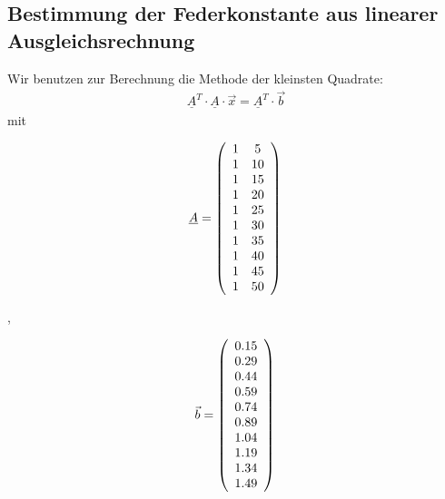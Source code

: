 \subsection{Bestimmung der Federkonstante aus linearer Ausgleichsrechnung}
Wir benutzen zur Berechnung die Methode der kleinsten Quadrate:
\begin{equation}
\begin{aligned}
  \underline{A}^T \cdot \underline{A} \cdot \vec{x} = \underline{A}^T \cdot \vec{b}
\end{aligned}
\end{equation}
mit 
  \begin{minipage}{0.48\linewidth}

    \[
    \underline{A} =
    \left(\begin{array}{cc}
      1 & 5\\
      1 & 10\\
      1 & 15\\
      1 & 20\\
      1 & 25\\
      1 & 30\\
      1 & 35\\
      1 & 40\\
      1 & 45\\
      1 & 50\\
    \end{array} \right)\\
    \]
    \end{minipage}
    \begin{minipage}{0.01\linewidth}
    \vspace{2pt}
    ,
    \end{minipage}
    \begin{minipage}{0.48\linewidth}
    
    \[
    \vec{b} =
    \left(\begin{array}{c}
      0.15\\
      0.29\\
      0.44\\
      0.59\\
      0.74\\
      0.89\\
      1.04\\
      1.19\\
      1.34\\
      1.49\\
    \end{array} \right) \\
    \]
    
    \end{minipage}
